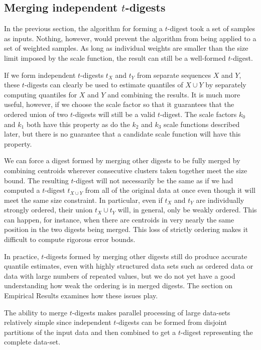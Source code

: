 \documentclass[]{statsoc}
\begin{document}
\subsection{Merging independent $t$-digests}
In the previous section, the algorithm for forming a $t$-digest took a set of samples as inputs. Nothing, however, would prevent the algorithm from being applied to a set of weighted samples. As long as individual weights are smaller than the size limit imposed by the scale function, the result can still be a well-formed $t$-digest.

If we form independent $t$-digests $t_X$ and $t_Y$ from separate sequences $X$ and $Y$, these $t$-digests can clearly be used to estimate quantiles of $X \cup Y$ by separately computing quantiles for $X$ and $Y$ and combining the results. It is much more useful, however, if we choose the scale factor so that it guarantees that the ordered union of two $t$-digests will still be a valid $t$-digest. The scale factors $k_0$ and $k_1$ both have this property as do the $k_2$ and $k_3$ scale functions described later, but there is no guarantee that a candidate scale function will have this property.

We can force a  digest formed by merging other digests to be fully merged by combining  centroids wherever consecutive clusters taken together meet the size bound. The resulting $t$-digest will not necessarily be the same as if we had computed a $t$-digest $t_{X \cup Y}$ from all of the original data at once even though it will meet the same size constraint. In particular, even if $t_X$ and $t_Y$ are individually strongly ordered, their union $t_X \cup t_Y$ will, in general, only be weakly ordered. This can happen, for instance, when there are centroids in very nearly the same position in the two digests being merged. This loss of strictly ordering makes it difficult to compute rigorous error bounds.

In practice, $t$-digests formed by merging other digests still do produce accurate quantile estimates, even with highly structured data sets such as ordered data or data with large numbers of repeated values, but we do not yet have a good understanding how weak the ordering is in merged digests. The section on Empirical Results examines how these issues play.

The ability to merge $t$-digests makes parallel processing of large data-sets relatively simple since independent $t$-digests can be formed from disjoint partitions of the input data and then combined to get a $t$-digest representing the complete data-set.
\end{document}
